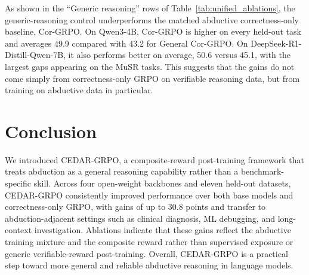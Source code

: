 \documentclass[11pt]{article}
\begin{document}
As shown in the ``Generic reasoning'' rows of Table~\ref{tab:unified_ablations}, the generic-reasoning control underperforms the matched abductive correctness-only baseline, Cor-GRPO. On Qwen3-4B, Cor-GRPO is higher on every held-out task and averages 49.9 compared with 43.2 for General Cor-GRPO. On DeepSeek-R1-Distill-Qwen-7B, it also performs better on average, 50.6 versus 45.1, with the largest gaps appearing on the MuSR tasks. This suggests that the gains do not come simply from correctness-only GRPO on verifiable reasoning data, but from training on abductive data in particular.


\section{Conclusion}
We introduced CEDAR-GRPO, a composite-reward post-training framework that treats abduction as a general reasoning capability rather than a benchmark-specific skill. Across four open-weight backbones and eleven held-out datasets, CEDAR-GRPO consistently improved performance over both base models and correctness-only GRPO, with gains of up to 30.8 points and transfer to abduction-adjacent settings such as clinical diagnosis, ML debugging, and long-context investigation. Ablations indicate that these gains reflect the abductive training mixture and the composite reward rather than supervised exposure or generic verifiable-reward post-training. Overall, CEDAR-GRPO is a practical step toward more general and reliable abductive reasoning in language models.
\end{document}
